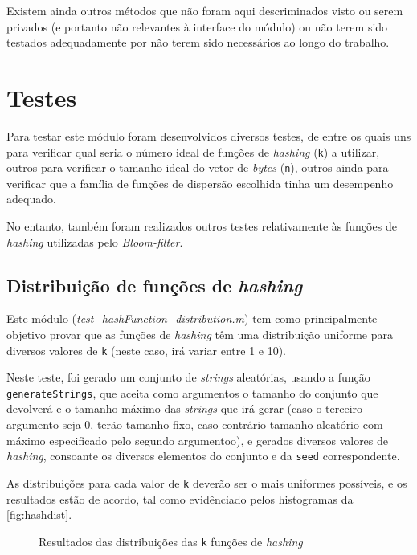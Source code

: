 \documentclass[a4paper,11pt,openright,oneside]{report}
\begin{document}
Existem ainda outros métodos que não foram aqui descriminados visto ou serem privados (e portanto não relevantes à interface do módulo) ou não terem sido testados adequadamente por não terem sido necessários ao longo do trabalho.

\section{Testes}
\label{sec.bloomtests}

Para testar este módulo foram desenvolvidos diversos testes, de entre os quais uns para verificar qual seria o número ideal de funções de \textit{hashing} (\texttt{k}) a utilizar, outros para verificar o tamanho ideal do vetor de \textit{bytes} (\texttt{n}), outros ainda para verificar que a família de funções de dispersão escolhida tinha um desempenho adequado.

No entanto, também foram realizados outros testes relativamente às funções de \textit{hashing} utilizadas pelo \textit{Bloom-filter}.

\subsection{Distribuição de funções de \textit{hashing}}
\label{subsec.hashdist}

Este módulo (\textit{test\_hashFunction\_distribution.m}) tem como principalmente objetivo provar que as funções de \textit{hashing} têm uma distribuição uniforme para diversos valores de \texttt{k} (neste caso, irá variar entre 1 e 10).

Neste teste, foi gerado um conjunto de \textit{strings} aleatórias, usando a função \texttt{generateStrings}, que aceita como argumentos o tamanho do conjunto que devolverá e o tamanho máximo das \textit{strings} que irá gerar (caso o terceiro argumento seja $0$, terão tamanho fixo, caso contrário tamanho aleatório com máximo especificado pelo segundo argumentoo), e gerados diversos valores de \textit{hashing}, consoante os diversos elementos do conjunto e da \texttt{seed} correspondente.

As distribuições para cada valor de \texttt{k} deverão ser o mais uniformes possíveis, e os resultados estão de acordo, tal como evidênciado pelos histogramas da \autoref{fig:hashdist}.

\begin{figure}[ht]
\center
{}
\caption{Resultados das distribuições das \texttt{k} funções de \textit{hashing}}
\label{fig:hashdist}
\end{figure}
\end{document}
